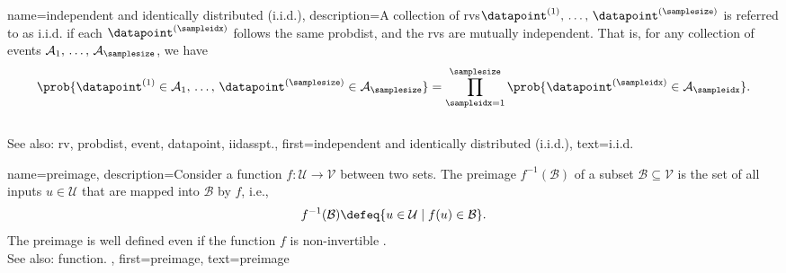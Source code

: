 {name={independent and identically distributed (i.i.d.)}, 
	description={A collection of \glspl{rv}\linebreak $\datapoint^{(1)}, \,\ldots, \,\datapoint^{(\samplesize)}$ is 
		referred to as i.i.d. 
		if each $\datapoint^{(\sampleidx)}$ follows the same \gls{probdist}, and 
		the \glspl{rv} are mutually independent. That is, for any collection of 
		\glspl{event} $\mathcal{A}_1, \,\ldots, \,\mathcal{A}_\samplesize$, we have
       		\[
          		\prob{ \datapoint^{(1)} \in \mathcal{A}_1, \,\ldots, \,\datapoint^{(\samplesize)} \in \mathcal{A}_{\samplesize}} 
         		= \prod_{\sampleidx=1}^{\samplesize} \prob{ \datapoint^{(\sampleidx)} \in \mathcal{A}_\sampleidx}.
         	\]
				\\
		See also: \gls{rv}, \gls{probdist}, \gls{event}, \gls{datapoint}, \gls{iidasspt}.},
	first={independent and identically distributed (i.i.d.)},
	text={{i.i.d.}} 
}

{name={preimage}, 
	description={Consider a \gls{function} $f\colon \mathcal{U} \rightarrow \mathcal{V}$ 
		between two sets. The preimage $f^{-1}(\mathcal{B})$ of a subset $\mathcal{B} \subseteq \mathcal{V}$ is the set 
		of all inputs $u \in \mathcal{U}$ that are mapped into $\mathcal{B}$ by $f$, i.e.,
		\[
		f^{-1}(\mathcal{B}) \defeq \{ u \in \mathcal{U} \mid f(u) \in \mathcal{B} \}.
		\]
		The preimage is well defined even if the \gls{function} $f$ is non-invertible \cite{RudinBookPrinciplesMatheAnalysis}.
		\\
		See also: \gls{function}. },
	first={preimage},
	text={preimage}
}

